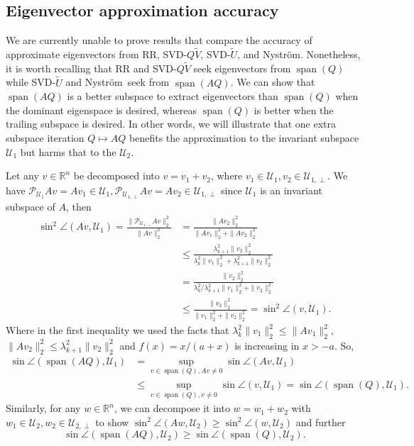 \documentclass[onefignum,onetabnum]{siamart251216}
\def\Nystrom{Nystr{\"o}m}
\def\leadingsubspace{\mathcal{U}_1}
\def\trailingsubspace{\mathcal{U}_2}
\def\projector{\mathcal{P}}
\newcommand{\image}{\operatorname{span}}
\begin{document}
\subsection{Eigenvector approximation accuracy}
\label{subsec:Eigenvector-analysis-subsection}
We are currently unable to prove results that compare the accuracy of approximate eigenvectors from RR, SVD-$Q\tilde{V}$, SVD-$\tilde{U}$, and \Nystrom. Nonetheless, it is worth recalling that RR and SVD-$Q\tilde{V}$ seek eigenvectors from $\image(Q)$ while SVD-$\tilde{U}$ and \Nystrom\ seek from $\image(AQ)$. We can show that $\image(AQ)$ is a better subspace to extract eigenvectors than $\image(Q)$ when the dominant eigenspace is desired, whereas $\image(Q)$ is better when the trailing subspace is desired. In other words, we will illustrate that one extra subspace iteration $Q \mapsto AQ$ benefits the approximation to the invariant subspace $\leadingsubspace$ but harms that to the $\trailingsubspace$.

Let any $v \in \mathbb{R}^n$ be decomposed into $v = v_1 + v_2$, where $v_1 \in \mathcal{U}_1, v_2 \in \mathcal{U}_{1,\perp}$. We have $\projector_{\leadingsubspace} Av = A v_1 \in \mathcal{U}_1, \projector_{\mathcal{U}_{1,\perp}} Av = Av_2 \in \mathcal{U}_{1,\perp}$ since $\mathcal{U}_1$ is an invariant subspace of $A$, then
\[
    \begin{aligned}
        \sin^2 \angle(Av, \leadingsubspace) = \frac{\|\projector_{\mathcal{U}_{1,\perp}} Av\|_2^2}{\|Av\|_2^2} & = \frac{\|Av_2\|_2^2}{\|Av_1\|_2^2 + \|A v_2\|_2^2} \\
        & \leq \frac{\lambda_{k+1}^2 \|v_2\|_2^2}{\lambda_{k}^2 \|v_1\|_2^2 + \lambda_{k+1}^2 \|v_2\|_2^2} \\
        & = \frac{\|v_2\|_2^2}{\lambda_{k}^2 / \lambda_{k+1}^2 \|v_1\|_2^2 + \|v_2\|_2^2} \\
        & \leq \frac{\|v_2\|_2^2}{\|v_1\|_2^2 + \|v_2\|_2^2} = \sin^2 \angle(v, \leadingsubspace).
    \end{aligned}
\]
Where in the first inequality we used the facts that $\lambda_{k}^2 \|v_1\|_2^2 \leq \|A v_1\|_2^2$, $\|A v_2\|_2^2 \leq \lambda_{k+1}^2 \|v_2\|_2^2$ and $f(x) = x/(a + x)$ is increasing in $x > -a$. So,
\[
    \begin{aligned}
        \sin \angle(\image(AQ), \leadingsubspace) & = \sup_{v \in \image(Q), Av \neq 0} \sin \angle(Av, \leadingsubspace) \\
        & \leq \sup_{v \in \image(Q), v \neq 0} \sin \angle(v, \leadingsubspace) = \sin \angle(\image(Q), \leadingsubspace).
    \end{aligned}
\]
Similarly, for any $w \in \mathbb{R}^n$, we can decompose it into $w = w_1 + w_2$ with $w_1 \in \trailingsubspace, w_2 \in \mathcal{U}_{2,\perp}$ to show $\sin^2 \angle(Aw, \trailingsubspace) \geq \sin^2 \angle(w, \trailingsubspace)$ and further 
\[
    \sin \angle(\image(AQ), \trailingsubspace) \geq \sin \angle(\image(Q), \trailingsubspace).
\]
\end{document}
